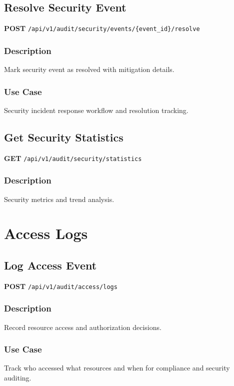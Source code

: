 \documentclass[11pt,a4paper]{report}
\begin{document}
\subsection{Resolve Security Event}

\textbf{POST} \texttt{/api/v1/audit/security/events/\{event\_id\}/resolve}

\subsubsection{Description}
Mark security event as resolved with mitigation details.

\subsubsection{Use Case}
Security incident response workflow and resolution tracking.

\subsection{Get Security Statistics}

\textbf{GET} \texttt{/api/v1/audit/security/statistics}

\subsubsection{Description}
Security metrics and trend analysis.

\section{Access Logs}

\subsection{Log Access Event}

\textbf{POST} \texttt{/api/v1/audit/access/logs}

\subsubsection{Description}
Record resource access and authorization decisions.

\subsubsection{Use Case}
Track who accessed what resources and when for compliance and security auditing.
\end{document}
